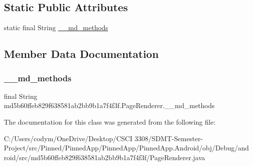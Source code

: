 \subsection*{Static Public Attributes}
\begin{DoxyCompactItemize}
\item 
static final String \hyperlink{classmd5b60ffeb829f638581ab2bb9b1a7f4f3f_1_1_page_renderer_aae4f94a2ae5f7a20817732bf98264a0a}{\+\_\+\+\_\+md\+\_\+methods}
\end{DoxyCompactItemize}


\subsection{Member Data Documentation}
\mbox{\label{classmd5b60ffeb829f638581ab2bb9b1a7f4f3f_1_1_page_renderer_aae4f94a2ae5f7a20817732bf98264a0a}} 
\subsubsection{\texorpdfstring{\+\_\+\+\_\+md\+\_\+methods}{\_\_md\_methods}}
{\footnotesize\ttfamily final String md5b60ffeb829f638581ab2bb9b1a7f4f3f.\+Page\+Renderer.\+\_\+\+\_\+md\+\_\+methods\hspace{0.3cm}{\ttfamily [static]}}



The documentation for this class was generated from the following file\+:\begin{DoxyCompactItemize}
\item 
C\+:/\+Users/codym/\+One\+Drive/\+Desktop/\+C\+S\+C\+I 3308/\+S\+D\+M\+T-\/\+Semester-\/\+Project/src/\+Pinned/\+Pinned\+App/\+Pinned\+App/\+Pinned\+App.\+Android/obj/\+Debug/android/src/md5b60ffeb829f638581ab2bb9b1a7f4f3f/Page\+Renderer.\+java\end{DoxyCompactItemize}
